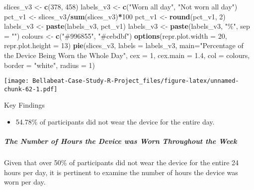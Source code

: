 \documentclass[
]{article}
\newenvironment{Shaded}{\begin{snugshade}}{\end{snugshade}}
\newcommand{\AttributeTok}[1]{\textcolor[rgb]{0.13,0.29,0.53}{#1}}
\newcommand{\DecValTok}[1]{\textcolor[rgb]{0.00,0.00,0.81}{#1}}
\newcommand{\FloatTok}[1]{\textcolor[rgb]{0.00,0.00,0.81}{#1}}
\newcommand{\FunctionTok}[1]{\textcolor[rgb]{0.13,0.29,0.53}{\textbf{#1}}}
\newcommand{\NormalTok}[1]{#1}
\newcommand{\OtherTok}[1]{\textcolor[rgb]{0.56,0.35,0.01}{#1}}
\newcommand{\SpecialCharTok}[1]{\textcolor[rgb]{0.81,0.36,0.00}{\textbf{#1}}}
\newcommand{\StringTok}[1]{\textcolor[rgb]{0.31,0.60,0.02}{#1}}
\providecommand{\tightlist}{%
  \setlength{\itemsep}{0pt}\setlength{\parskip}{0pt}}
\begin{document}
\begin{Shaded}
\begin{Highlighting}[]
\NormalTok{slices\_v3 }\OtherTok{\textless{}{-}} \FunctionTok{c}\NormalTok{(}\DecValTok{378}\NormalTok{, }\DecValTok{458}\NormalTok{)}
\NormalTok{labels\_v3 }\OtherTok{\textless{}{-}} \FunctionTok{c}\NormalTok{(}\StringTok{"Worn all day"}\NormalTok{, }\StringTok{"Not worn all day"}\NormalTok{)}
\NormalTok{pct\_v1 }\OtherTok{\textless{}{-}}\NormalTok{ slices\_v3}\SpecialCharTok{/}\FunctionTok{sum}\NormalTok{(slices\_v3)}\SpecialCharTok{*}\DecValTok{100}
\NormalTok{pct\_v1 }\OtherTok{\textless{}{-}} \FunctionTok{round}\NormalTok{(pct\_v1, }\DecValTok{2}\NormalTok{)}
\NormalTok{labels\_v3 }\OtherTok{\textless{}{-}} \FunctionTok{paste}\NormalTok{(labels\_v3, pct\_v1)}
\NormalTok{labels\_v3 }\OtherTok{\textless{}{-}} \FunctionTok{paste}\NormalTok{(labels\_v3, }\StringTok{"\%"}\NormalTok{, }\AttributeTok{sep =} \StringTok{""}\NormalTok{)}
\NormalTok{colours }\OtherTok{\textless{}{-}} \FunctionTok{c}\NormalTok{(}\StringTok{"\#996855"}\NormalTok{, }\StringTok{"\#cebdbf"}\NormalTok{)}
\FunctionTok{options}\NormalTok{(}\AttributeTok{repr.plot.width =} \DecValTok{20}\NormalTok{, }\AttributeTok{repr.plot.height =} \DecValTok{13}\NormalTok{)}
\FunctionTok{pie}\NormalTok{(slices\_v3, }\AttributeTok{labels =}\NormalTok{ labels\_v3,}
    \AttributeTok{main=}\StringTok{"Percentage of the Device Being Worn the Whole Day"}\NormalTok{, }\AttributeTok{cex =} \DecValTok{1}\NormalTok{, }\AttributeTok{cex.main =} \FloatTok{1.4}\NormalTok{, }\AttributeTok{col =}\NormalTok{ colours, }\AttributeTok{border =} \StringTok{"white"}\NormalTok{, }\AttributeTok{radius =} \DecValTok{1}\NormalTok{)}
\end{Highlighting}
\end{Shaded}

\texttt{[image: Bellabeat-Case-Study-R-Project\_files/figure-latex/unnamed-chunk-62-1.pdf]}

Key Findings

\begin{itemize}
\tightlist
\item
  54.78\% of participants did not wear the device for the entire day.
\end{itemize}

\hypertarget{the-number-of-hours-the-device-was-worn-throughout-the-week}{%
\subparagraph{The Number of Hours the Device was Worn Throughout the
Week}\label{the-number-of-hours-the-device-was-worn-throughout-the-week}}

Given that over 50\% of participants did not wear the device for the
entire 24 hours per day, it is pertinent to examine the number of hours
the device was worn per day.
\end{document}
